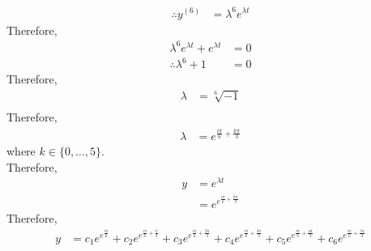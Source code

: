 \documentclass[fleqn, a4paper, 11pt, oneside]{amsart}
\theoremstyle{definition}
\theoremstyle{theorem}
\begin{document}
\begin{solution}
\begin{enumerate}[leftmargin = *]
\begin{align*}
				\therefore y^{(6)} & = \lambda^6 e^{\lambda t}
			\end{align*}
			Therefore,
			\begin{align*}
				\lambda^6 e^{\lambda t} + e^{\lambda t} & = 0 \\
				\therefore \lambda^6 + 1                & = 0
			\end{align*}
			Therefore,
			\begin{align*}
				\lambda & = \sqrt[6]{-1} \\
			\end{align*}
			Therefore,
			\begin{align*}
				\lambda & = e^{\frac{i \pi}{6} + \frac{k \pi}{3}}
			\end{align*}
			where $k \in \{0,\dots,5\}$.\\
			Therefore,
			\begin{align*}
				y & = e^{\lambda t} \\
                                  & = e^{e^{\frac{i \pi}{6} + \frac{k \pi}{3}}}
			\end{align*}
			Therefore,
			\begin{align*}
				y &= c_1 e^{e^{\frac{i \pi}{6}}} + c_2 e^{e^{\frac{i \pi}{6} + \frac{\pi}{3}}} + c_3 e^{e^{\frac{i \pi}{6} + \frac{2 \pi}{3}}} + c_4 e^{e^{\frac{i \pi}{6} + \frac{3 \pi}{3}}} + c_5 e^{e^{\frac{i \pi}{6} + \frac{4 \pi}{3}}} + c_6 e^{e^{\frac{i \pi}{6} + \frac{5 \pi}{3}}}
			\end{align*}
	\end{enumerate}
\end{solution}
\end{document}
